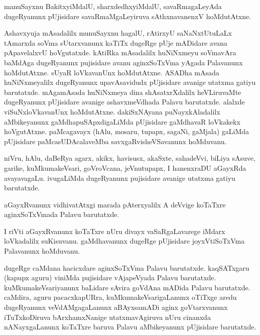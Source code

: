 \documentclass{article}
\begin{document}
\begin{mng}%
manuSayxnu BakitxyiMdalU, sharxdedhxyiMdalU, savaRmagaLeyAda dugeRyanunx pUjisidare 
savaRmaMgaLeyiruva sAthxnavanenxV hoMdutAtxne.
\end{mng}

\begin{mng}%
Ashavxyuja mAsadalilx munuSayxnu hagalU, rAtirxyU saNaNxtUtuLaLx tAmarxda soVma sUtarxvanunx 
kaTiTx dugeRge pUje mADidare avana pApavelalxvU hoVgutatxde. kAtiRka mAsadalilx huNiNxmeyu
soVmavAra baMdAga dugeRyanunx pujisidare avanu aginxSoTxVma yAgada Palavanunx hoMdutAtxne. sUyaR 
loVkavanUnx hoMdutAtxne. ASADha mAsada huNiNxmeyalilx dugeRyanunx upavAsavidudx pUjisidare avanige 
utatxma gatiyu barutatxde. mAgamAsada huNiNxmeya dina shAsatxrXdalilx heVLiruvaMte dugeRyanunx 
pUjisidare avanige ashavxmeVdhada Palavu barutatxde. alalxde viSuNxloVkavanUnx hoMdutAtxne. 
dakiSxNAyana puNayxkAladalilx aMbikeyanunx gaMdhapuSApxdigaLiMda pUjisidare gaMdhavaR loVkakekx 
hoVgutAtxne. paMcagavayx (hAlu, mosaru, tupapx, sagaNi, gaMjala) gaLiMda pUjisidare 
paMcasUDAcalaveMba savxgaRvisheVSavanunx hoMduvanu.
\end{mng}

\begin{mng}%
niVru, hAlu, daBeRya agarx, akikx, havisusx, akaSxte, sahadeVvi, biLiya sAsuve, garike, 
kuMkumakeVsari, goVroVcana, jeVnutupapx, I hanenxraDU aGayxRda avayavagaLu. ivugaLiMda 
dugeRyanunx pujisidare avanige utatxma gatiyu barutatxde.
\end{mng}

\begin{mng}%
aGayxRvanunx vidhivatAtxgi marada pAterxyalilx A deVvige koTaTxre aginxSoTxVmada Palavu barutatxde.
\end{mng}

\begin{mng}%
I riVti aGayxRvanunx koTaTxre nUru divayx vaSaRgaLavarege iMdarx loVkadalilx suKisuvanu. 
gaMdhavanunx dugeRge pUjisidare joyxVtiSoTxVma Palavanunx hoMduvanu.
\end{mng}

\begin{mng}%
dugeRge caMdana hacicxdare aginxSoTxVma Palavu barutatxde. kaqSATxgaru (kapupx aguru) viniMda 
pujisidare vAjapeVyada Palavu barutatxde. kuMkumakeVsariyanunx baLidare sAvira goVdAna mADida 
Palavu barutatxde. caMdira, aguru pacacxkapURra, kuMkumakeVsarigaLanunx oTiTxge aredu dugeRyanunx 
veVdAMgagaLanunx aBAyxsamADi aginx goVtarxvanunx iTuTxkoDiruva bArxhamxNanige utatxmavAgiruva 
nUru cinanxda nANayxgaLanunx koTaTxre baruva Palavu aMbikeyanunx pUjisidare barutatxde.
\end{mng}
\end{document}
